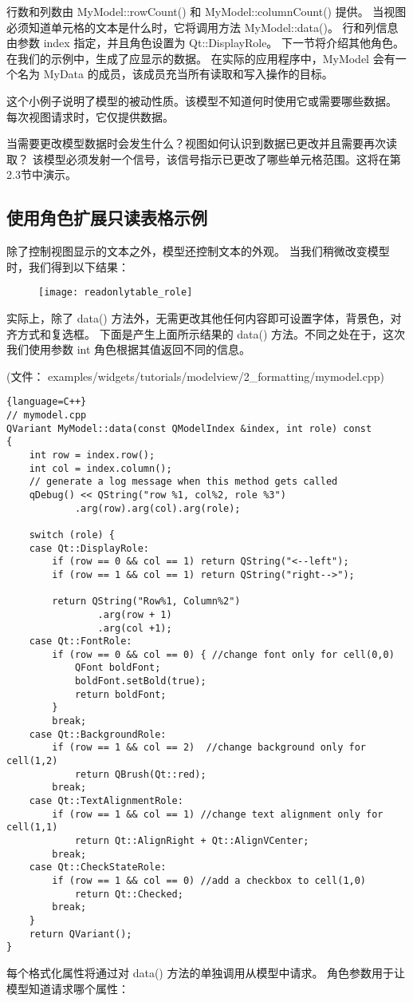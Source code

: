 行数和列数由 MyModel::rowCount() 和 MyModel::columnCount() 提供。
当视图必须知道单元格的文本是什么时，它将调用方法 MyModel::data()。
行和列信息由参数 index 指定，并且角色设置为 Qt::DisplayRole。
下一节将介绍其他角色。在我们的示例中，生成了应显示的数据。
在实际的应用程序中，MyModel 会有一个名为 MyData 的成员，该成员充当所有读取和写入操作的目标。

这个小例子说明了模型的被动性质。该模型不知道何时使用它或需要哪些数据。
每次视图请求时，它仅提供数据。

当需要更改模型数据时会发生什么？视图如何认识到数据已更改并且需要再次读取？
该模型必须发射一个信号，该信号指示已更改了哪些单元格范围。这将在第2.3节中演示。

\subsection{使用角色扩展只读表格示例}

除了控制视图显示的文本之外，模型还控制文本的外观。
当我们稍微改变模型时，我们得到以下结果：

\begin{figure}[hbt!]  
\texttt{[image: readonlytable\_role]}
\end{figure}

实际上，除了 data() 方法外，无需更改其他任何内容即可设置字体，背景色，对齐方式和复选框。
下面是产生上面所示结果的 data() 方法。不同之处在于，这次我们使用参数 int 角色根据其值返回不同的信息。

(文件： examples/widgets/tutorials/modelview/2\_formatting/mymodel.cpp)

\begin{lstlisting}{language=C++}
// mymodel.cpp
QVariant MyModel::data(const QModelIndex &index, int role) const
{
    int row = index.row();
    int col = index.column();
    // generate a log message when this method gets called
    qDebug() << QString("row %1, col%2, role %3")
            .arg(row).arg(col).arg(role);

    switch (role) {
    case Qt::DisplayRole:
        if (row == 0 && col == 1) return QString("<--left");
        if (row == 1 && col == 1) return QString("right-->");

        return QString("Row%1, Column%2")
                .arg(row + 1)
                .arg(col +1);
    case Qt::FontRole:
        if (row == 0 && col == 0) { //change font only for cell(0,0)
            QFont boldFont;
            boldFont.setBold(true);
            return boldFont;
        }
        break;
    case Qt::BackgroundRole:
        if (row == 1 && col == 2)  //change background only for cell(1,2)
            return QBrush(Qt::red);
        break;
    case Qt::TextAlignmentRole:
        if (row == 1 && col == 1) //change text alignment only for cell(1,1)
            return Qt::AlignRight + Qt::AlignVCenter;
        break;
    case Qt::CheckStateRole:
        if (row == 1 && col == 0) //add a checkbox to cell(1,0)
            return Qt::Checked;
        break;
    }
    return QVariant();
}
\end{lstlisting}

每个格式化属性将通过对 data() 方法的单独调用从模型中请求。
角色参数用于让模型知道请求哪个属性：

